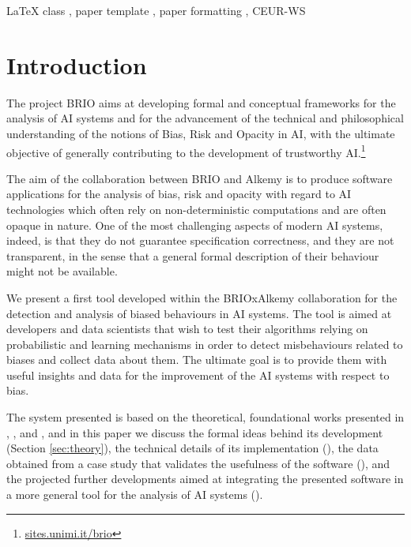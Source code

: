 \documentclass[
]{ceurart}
\begin{document}
\begin{keywords}
  LaTeX class \sep
  paper template \sep
  paper formatting \sep
  CEUR-WS
\end{keywords}

\maketitle

\section{Introduction}
\label{sec:intro}


The project BRIO aims at developing formal and conceptual frameworks for the analysis of AI systems and for the advancement of the technical and philosophical understanding of the notions of Bias, Risk and Opacity in AI, with the ultimate objective of generally contributing to the development of trustworthy AI.\footnote{\url{sites.unimi.it/brio}} 

The aim of the collaboration between BRIO and Alkemy is to produce software applications for the analysis of bias, risk and opacity with regard to AI technologies which often rely on non-deterministic computations and  are often opaque in nature. One of the most challenging aspects of modern AI systems, indeed, is that they do not guarantee specification correctness, and they are not transparent, in the sense that a general formal description of their behaviour might not be available.

We present a first tool developed within the BRIOxAlkemy collaboration for the detection and analysis of biased behaviours in AI systems. The tool is aimed at developers and data scientists that wish to test their algorithms relying on probabilistic and learning mechanisms in order to detect misbehaviours related to biases and collect data about them. The ultimate goal is to provide them with useful insights and data for the improvement of the AI systems with respect to bias.

The system presented is based on the theoretical, foundational works presented in \cite{dap21}, \cite{dagp22}, and \cite{gp23}, and in this paper we discuss the formal ideas behind its development (Section \ref{sec:theory}), the technical details of its implementation  (), the data obtained from a case study that validates the usefulness of the software (), and the projected further developments aimed at integrating the presented software in a more general tool for the analysis of AI systems ().
\end{document}
